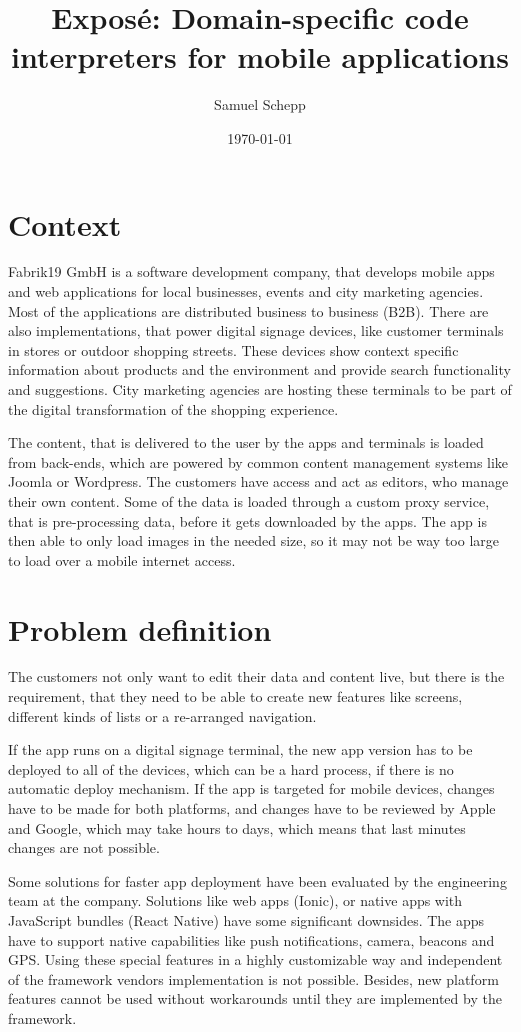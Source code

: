 \documentclass{article}
\title{Exposé: Domain-specific code interpreters for mobile applications}
\author{Samuel Schepp}
\date{\today}
\begin{document}
	
\maketitle
	
\section*{Context}

Fabrik19 GmbH is a software development company, that develops mobile apps and web applications for local businesses, events and city marketing agencies.
Most of the applications are distributed business to business (B2B).
There are also implementations, that power digital signage devices, like customer terminals in stores or outdoor shopping streets.
These devices show context specific information about products and the environment and provide search functionality and suggestions.
City marketing agencies are hosting these terminals to be part of the digital transformation of the shopping experience.

The content, that is delivered to the user by the apps and terminals is loaded from back-ends, which are powered by common content management systems like Joomla or Wordpress.
The customers have access and act as editors, who manage their own content.
Some of the data is loaded through a custom proxy service, that is pre-processing data, before it gets downloaded by the apps.
The app is then able to only load images in the needed size, so it may not be way too large to load over a mobile internet access.

\section*{Problem definition}

The customers not only want to edit their data and content live, but there is the requirement, that they need to be able to create new features like screens, different kinds of lists or a re-arranged navigation.

If the app runs on a digital signage terminal, the new app version has to be deployed to all of the devices, which can be a hard process, if there is no automatic deploy mechanism.
If the app is targeted for mobile devices, changes have to be made for both platforms, and changes have to be reviewed by Apple and Google, which may take hours to days, which means that last minutes changes are not possible.

Some solutions for faster app deployment have been evaluated by the engineering team at the company.
Solutions like web apps (Ionic), or native apps with JavaScript bundles (React Native) have some significant downsides.
The apps have to support native capabilities like push notifications, camera, beacons and GPS.
Using these special features in a highly customizable way and independent of the framework vendors implementation is not possible.
Besides, new platform features cannot be used without workarounds until they are implemented by the framework.
\end{document}
